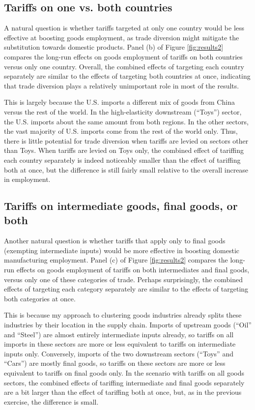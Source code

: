 \documentclass[12pt]{article}
\begin{document}
\subsection{Tariffs on one vs. both countries}
A natural question is whether tariffs targeted at only one country would be less effective at boosting goods employment, as trade diversion might mitigate the substitution towards domestic products. Panel (b) of Figure \ref{fig:results2} compares the long-run effects on goods employment of tariffs on both countries versus only one country. Overall, the combined effects of targeting each country separately are similar to the effects of targeting both countries at once, indicating that trade diversion plays a relatively unimportant role in most of the results.

This is largely because the U.S. imports a different mix of goods from China versus the rest of the world. In the high-elasticity downstream (``Toys'') sector, the U.S. imports about the same amount from both regions. In the other sectors, the vast majority of U.S. imports come from the rest of the world only. Thus, there is little potential for trade diversion when tariffs are levied on sectors other than Toys. When tariffs are levied on Toys only, the combined effect of tariffing each country separately is indeed noticeably smaller than the effect of tariffing both at once, but the difference is still fairly small relative to the overall increase in employment.

\subsection{Tariffs on intermediate goods, final goods, or both}
Another natural question is whether tariffs that apply only to final goods (exempting intermediate inputs) would be more effective in boosting domestic manufacturing employment. Panel (c) of Figure \ref{fig:results2} compares the long-run effects on goods employment of tariffs on both intermediates and final goods, versus only one of these categories of trade. Perhaps surprisingly, the combined effects of targeting each category separately are similar to the effects of targeting both categories at once.

This is because my approach to clustering goods industries already splits these industries by their location in the supply chain. Imports of upstream goods (``Oil'' and ``Steel'') are almost entirely intermediate inputs already, so tariffs on all imports in these sectors are more or less equivalent to tariffs on intermediate inputs only. Conversely, imports of the two downstream sectors (``Toys'' and ``Cars'') are mostly final goods, so tariffs on these sectors are more or less equivalent to tariffs on final goods only. In the scenario  with tariffs on all goods sectors, the combined effects of tariffing intermediate and final goods separately are a bit larger than the effect of tariffing both at once, but, as in the previous exercise, the difference is small.
\end{document}
